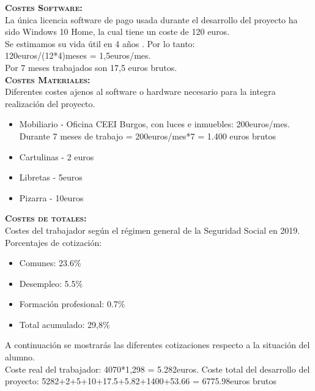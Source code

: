 \textbf{\textsc{Costes Software:}}\\
La única licencia software de pago usada durante el desarrollo del proyecto ha sido Windows 10 Home, la cual tiene un coste de 120 euros.\\
Se estimamos su vida útil en 4 años \cite{vidautil}. Por lo tanto:\\
120euros/(12*4)meses = 1,5euros/mes.\\
Por 7 meses trabajados son 17,5 euros brutos.\\

\textbf{\textsc{Costes Materiales:}}\\
Diferentes costes ajenos al software o hardware necesario para la integra realización del proyecto.
\begin{itemize}
\item Mobiliario - Oficina CEEI Burgos, con luces e inmuebles: 200euros/mes.\\
Durante 7 meses de trabajo = 200euros/mes*7 = 1.400 euros brutos\\
\item Cartulinas - 2 euros
\item Libretas - 5euros
\item Pizarra - 10euros
\end{itemize}

\textbf{\textsc{Costes de totales:}}\\
Costes del trabajador según el régimen general de la Seguridad Social en 2019. \cite{ssocial} \\
Porcentajes de cotización:
\begin{itemize}
\item Comunes: 23.6\%
\item Desempleo: 5.5\%
\item Formación profesional: 0.7\%
\item Total acumulado: 29,8\%
\end{itemize}
A continuación se mostrarás las diferentes cotizaciones respecto a la situación del alumno.\\
Coste real del trabajador: 4070*1,298 =  5.282euros.
Coste total del desarrollo del proyecto:
5282+2+5+10+17.5+5.82+1400+53.66 = 6775.98euros brutos\\

